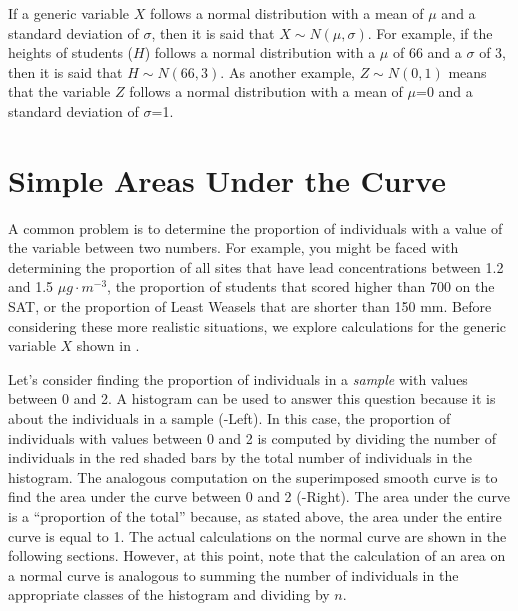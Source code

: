 \documentclass[10pt,openany]{book}\usepackage[]{graphicx}\usepackage[]{color}
\begin{document}
If a generic variable $X$ follows a normal distribution with a mean of $\mu$ and a standard deviation of $\sigma$, then it is said that $X\sim N(\mu,\sigma)$. For example, if the heights of students ($H$) follows a normal distribution with a $\mu$ of 66 and a $\sigma$ of 3, then it is said that $H\sim N(66,3)$. As another example, $Z\sim N(0,1)$ means that the variable $Z$ follows a normal distribution with a mean of $\mu$=0 and a standard deviation of $\sigma$=1.


\section{Simple Areas Under the Curve}
A common problem is to determine the proportion of individuals with a value of the variable between two numbers. For example, you might be faced with determining the proportion of all sites that have lead concentrations between 1.2 and 1.5 $\mu g \cdot m^{-3}$, the proportion of students that scored higher than 700 on the SAT, or the proportion of Least Weasels that are shorter than 150 mm. Before considering these more realistic situations, we explore calculations for the generic variable $X$ shown in .

Let's consider finding the proportion of individuals in a \textit{sample} with values between 0 and 2. A histogram can be used to answer this question because it is about the individuals in a sample (-Left). In this case, the proportion of individuals with values between 0 and 2 is computed by dividing the number of individuals in the red shaded bars by the total number of individuals in the histogram. The analogous computation on the superimposed smooth curve is to find the area under the curve between 0 and 2 (-Right). The area under the curve is a ``proportion of the total'' because, as stated above, the area under the entire curve is equal to 1. The actual calculations on the normal curve are shown in the following sections. However, at this point, note that the calculation of an area on a normal curve is analogous to summing the number of individuals in the appropriate classes of the histogram and dividing by $n$.
\end{document}
